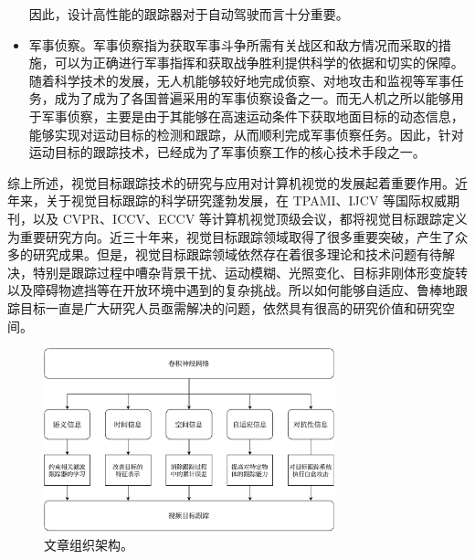 \begin{itemize}
因此，设计高性能的跟踪器对于自动驾驶而言十分重要。%
\item 军事侦察。军事侦察指为获取军事斗争所需有关战区和敌方情况而采取的措施，可以为正确进行军事指挥和获取战争胜利提供科学的依据和切实的保障。随着科学技术的发展，无人机能够较好地完成侦察、对地攻击和监视等军事任务，成为了成为了各国普遍采用的军事侦察设备之一。而无人机之所以能够用于军事侦察，主要是由于其能够在高速运动条件下获取地面目标的动态信息，能够实现对运动目标的检测和跟踪，从而顺利完成军事侦察任务。因此，针对运动目标的跟踪技术，已经成为了军事侦察工作的核心技术手段之一。
\end{itemize}

综上所述，视觉目标跟踪技术的研究与应用对计算机视觉的发展起着重要作用。近年来，关于视觉目标跟踪的科学研究蓬勃发展，在 TPAMI、IJCV 等国际权威期刊，以及 CVPR、ICCV、ECCV 等计算机视觉顶级会议，都将视觉目标跟踪定义为重要研究方向。近三十年来，视觉目标跟踪领域取得了很多重要突破，产生了众多的研究成果。但是，视觉目标跟踪领域依然存在着很多理论和技术问题有待解决，特别是跟踪过程中嘈杂背景干扰、运动模糊、光照变化、目标非刚体形变旋转以及障碍物遮挡等在开放环境中遇到的复杂挑战。所以如何能够自适应、鲁棒地跟踪目标一直是广大研究人员亟需解决的问题，依然具有很高的研究价值和研究空间。

\begin{figure}
\centering
\includegraphics[width=0.75\textwidth]{Img/paper_arch.pdf}
\caption{文章组织架构。}
\end{figure}

